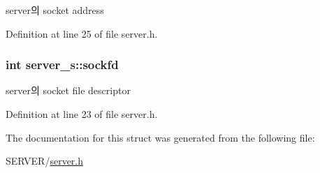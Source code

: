 server의 socket address 



Definition at line 25 of file server.\-h.

\hypertarget{structserver__s_a7109ed4db0376f7de840d82c4379099d}{
\subsubsection[{sockfd}]{\setlength{\rightskip}{0pt plus 5cm}int server\-\_\-s\-::sockfd}}\label{structserver__s_a7109ed4db0376f7de840d82c4379099d}


server의 socket file descriptor 



Definition at line 23 of file server.\-h.



The documentation for this struct was generated from the following file\-:\begin{DoxyCompactItemize}
\item 
S\-E\-R\-V\-E\-R/\hyperlink{server_8h}{server.\-h}\end{DoxyCompactItemize}
